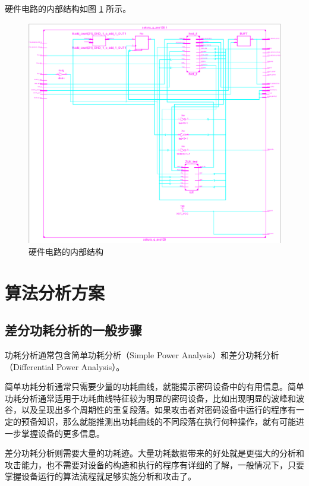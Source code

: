 \newpage

硬件电路的内部结构如图 \ref{fig:circuit_more} 所示。

\begin{figure}[htbp]
    \centering
    \includegraphics[height=.6\textheight]{../images/circuit_more.png}
    \caption{硬件电路的内部结构}
    \label{fig:circuit_more}
\end{figure}

\newpage

\section{算法分析方案} %
\label{sec:zuc_attack}

\subsection{差分功耗分析的一般步骤} %
\label{sec:dpa}
功耗分析通常包含简单功耗分析（Simple Power Analysis）和差分功耗分析（Differential Power Analysis）。

简单功耗分析通常只需要少量的功耗曲线，就能揭示密码设备中的有用信息。简单功耗分析通常适用于功耗曲线特征较为明显的密码设备，比如出现明显的波峰和波谷，以及呈现出多个周期性的重复段落。如果攻击者对密码设备中运行的程序有一定的预备知识，那么就能推测出功耗曲线的不同段落在执行何种操作，就有可能进一步掌握设备的更多信息。

差分功耗分析则需要大量的功耗迹。大量功耗数据带来的好处就是更强大的分析和攻击能力，也不需要对设备的构造和执行的程序有详细的了解，一般情况下，只要掌握设备运行的算法流程就足够实施分析和攻击了。


